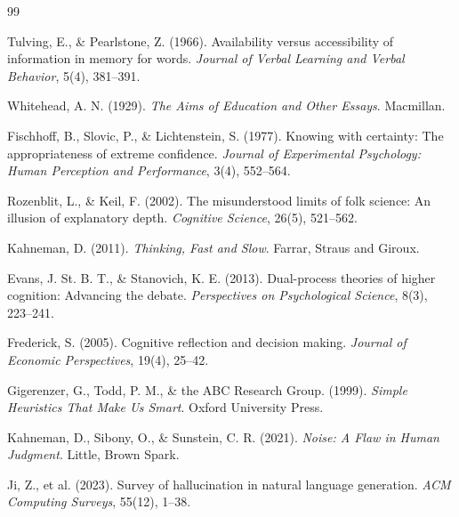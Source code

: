 \documentclass[11pt,a4paper]{article}
\begin{document}


\begin{thebibliography}{99}

Tulving, E., \& Pearlstone, Z. (1966). Availability versus accessibility of information in memory for words. \emph{Journal of Verbal Learning and Verbal Behavior}, 5(4), 381--391.

Whitehead, A. N. (1929). \emph{The Aims of Education and Other Essays}. Macmillan.

Fischhoff, B., Slovic, P., \& Lichtenstein, S. (1977). Knowing with certainty: The appropriateness of extreme confidence. \emph{Journal of Experimental Psychology: Human Perception and Performance}, 3(4), 552--564.

Rozenblit, L., \& Keil, F. (2002). The misunderstood limits of folk science: An illusion of explanatory depth. \emph{Cognitive Science}, 26(5), 521--562.

Kahneman, D. (2011). \emph{Thinking, Fast and Slow}. Farrar, Straus and Giroux.

Evans, J. St. B. T., \& Stanovich, K. E. (2013). Dual-process theories of higher cognition: Advancing the debate. \emph{Perspectives on Psychological Science}, 8(3), 223--241.

Frederick, S. (2005). Cognitive reflection and decision making. \emph{Journal of Economic Perspectives}, 19(4), 25--42.

Gigerenzer, G., Todd, P. M., \& the ABC Research Group. (1999). \emph{Simple Heuristics That Make Us Smart}. Oxford University Press.

Kahneman, D., Sibony, O., \& Sunstein, C. R. (2021). \emph{Noise: A Flaw in Human Judgment}. Little, Brown Spark.

Ji, Z., et al. (2023). Survey of hallucination in natural language generation. \emph{ACM Computing Surveys}, 55(12), 1--38.

\end{thebibliography}
\end{document}
